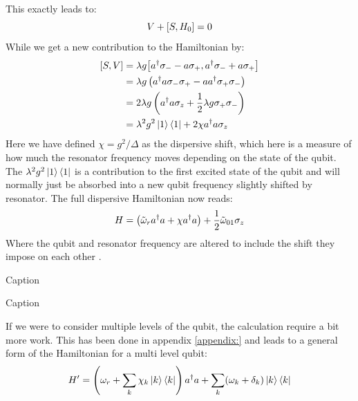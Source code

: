 This exactly leads to:
\begin{equation*}
    V + \comm{S}{H_0} = 0
\end{equation*}
While we get a new contribution to the Hamiltonian by:
\begin{align*}
    \comm{S}{V} &= \lambda g \comm{a^\dagger \sigma_- - a \sigma_+}{a^\dagger \sigma_- + a \sigma_+} \\
                &= \lambda g \left(a^\dagger a \sigma_- \sigma_+ - a a^\dagger \sigma_+ \sigma_-\right) \\
                &= 2 \lambda g \left(a^\dagger a \sigma_z + \frac12 \lambda g \sigma_+\sigma_-\right) \\
                &= \lambda^2 g^2 \ket{1}\bra{1} + 2 \chi a^\dagger a \sigma_z
\end{align*}
Here we have defined $\chi= g^2 / \Delta$ as the dispersive shift, which here is a measure of how much the resonator frequency moves depending on the state of the qubit. The $\lambda^2 g^2 \ket{1}\bra{1}$ is a contribution to the first excited state of the qubit and will normally just be absorbed into a new qubit frequency slightly shifted by resonator. The full dispersive Hamiltonian now reads:
\begin{equation}
    H = \left(\Tilde{\omega}_r a^\dagger a + \chi a^\dagger a \right)  + \frac12 \Tilde{\omega}_{01} \sigma_z
\end{equation}
Where the qubit and resonator frequency are altered to include the shift they impose on each other \cite{boissonneault_dispersive_2009}.
\begin{marginfigure}
    \centering
    \caption{Caption}
    \label{fig:dispersive_two_level_qubit}
\end{marginfigure}
\begin{marginfigure}
    \centering
    \caption{Caption}
    \label{fig:dispersive_two_level_qubit}
\end{marginfigure}
If we were to consider multiple levels of the qubit, the calculation require a  bit more work. This has been done in appendix \ref{appendix:} and leads to a general form of the Hamiltonian for a multi level qubit:
\begin{equation}\label{eq:multi_qubit_dispersive_hamiltonian}
    H' = \left(\omega_r + \sum_k \chi_k \ket{k}\bra{k} \right) a^\dagger a + \sum_k (\omega_k + \delta_k)\ket{k}\bra{k}
\end{equation}
